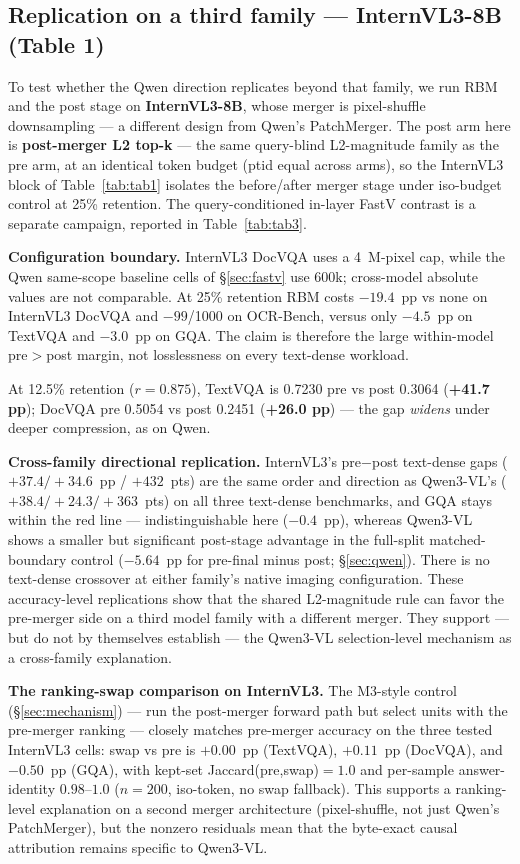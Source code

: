 \documentclass[journal]{IEEEtran}
\begin{document}
\subsection{Replication on a third family --- InternVL3-8B (Table 1)}\label{sec:internvl}

To test whether the Qwen direction replicates beyond that family, we run RBM
and the post stage on \textbf{InternVL3-8B},
whose merger is pixel-shuffle downsampling --- a different design from Qwen's
PatchMerger. The post arm here is \textbf{post-merger L2 top-k} --- the
same query-blind L2-magnitude family as the pre arm, at an identical
token budget (ptid equal across arms), so the InternVL3 block of
Table~\ref{tab:tab1} isolates the before/after merger stage under iso-budget
control at 25\% retention. The query-conditioned in-layer FastV contrast is a separate campaign,
reported in Table~\ref{tab:tab3}.

\textbf{Configuration boundary.} InternVL3 DocVQA uses a 4~M-pixel cap, while
the Qwen same-scope baseline cells of \S\ref{sec:fastv} use 600k; cross-model
absolute values are not comparable. At 25\% retention RBM costs $-19.4$~pp vs
none on InternVL3 DocVQA and $-99$/1000 on OCR-Bench, versus only $-4.5$~pp on
TextVQA and $-3.0$~pp on GQA. The claim is therefore the large within-model
pre$>$post margin, not losslessness on every text-dense workload.

At 12.5\% retention ($r=0.875$), TextVQA is 0.7230 pre
vs post 0.3064 (\textbf{+41.7 pp}); DocVQA pre 0.5054 vs post 0.2451
(\textbf{+26.0 pp}) --- the gap \emph{widens} under deeper compression, as on
Qwen.

\textbf{Cross-family directional replication.} InternVL3's pre$-$post text-dense gaps
($+37.4 / +34.6$~pp / $+432$~pts) are the same order and direction as
Qwen3-VL's ($+38.4 / +24.3 / +363$~pts) on all three text-dense benchmarks, and
  GQA stays within the red line --- indistinguishable here ($-0.4$~pp), whereas
  Qwen3-VL shows a smaller but significant post-stage advantage in the
  full-split matched-boundary control ($-5.64$~pp for pre-final minus post;
  \S\ref{sec:qwen}). There is no text-dense crossover at either family's native
  imaging configuration. These
accuracy-level replications show that the shared L2-magnitude rule can favor
the pre-merger side on a third model family with a different merger. They support
--- but do not by themselves establish --- the Qwen3-VL selection-level
mechanism as a cross-family explanation.

\textbf{The ranking-swap comparison on InternVL3.} The M3-style control
(\S\ref{sec:mechanism}) --- run the post-merger forward path but select units
with the pre-merger ranking --- closely matches pre-merger accuracy on the
three tested InternVL3 cells: swap vs pre is $+0.00$~pp (TextVQA), $+0.11$~pp
(DocVQA), and $-0.50$~pp (GQA), with kept-set Jaccard(pre,swap)$= 1.0$ and
per-sample answer-identity $0.98$--$1.0$ ($n=200$, iso-token, no swap
fallback). This supports a ranking-level explanation on a second merger
architecture (pixel-shuffle, not just Qwen's PatchMerger), but the nonzero
residuals mean that the byte-exact causal attribution remains specific to
Qwen3-VL.
\end{document}
